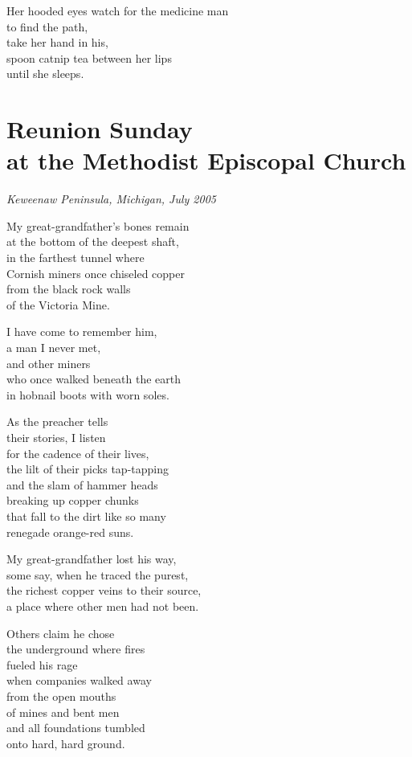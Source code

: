 \documentclass[twoside,10pt]{book}
\begin{document}
Her hooded eyes watch for the medicine man\\
to find the path,\\
take her hand in his,\\
spoon catnip tea between her lips\\
until she sleeps.


\clearpage
\section{Reunion Sunday\\
  at the Methodist Episcopal Church}

\emph{Keweenaw Peninsula, Michigan, July 2005}

My great-grandfather's bones remain\\
at the bottom of the deepest shaft,\\
in the farthest tunnel where\\
Cornish miners once chiseled copper\\
from the black rock walls\\
of the Victoria Mine.

I have come to remember him,\\
a man I never met,\\
and other miners\\
who once walked beneath the earth\\
in hobnail boots with worn soles.

As the preacher tells\\
their stories, I listen\\
for the cadence of their lives,\\
the lilt of their picks tap-tapping\\
and the slam of hammer heads\\
breaking up copper chunks\\
that fall to the dirt like so many\\
renegade orange-red suns.

My great-grandfather lost his way,\\
some say, when he traced the purest,\\
the richest copper veins to their source,\\
a place where other men had not been.

Others claim he chose\\
the underground where fires\\
fueled his rage\\
when companies walked away\\
from the open mouths\\
of mines and bent men\\
and all foundations tumbled\\
onto hard, hard ground.
\end{document}

